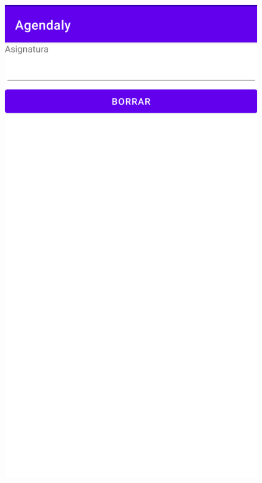 \documentclass[a4paper,openright,12pt]{article}
\begin{document}
\begin{figure}
            \includegraphics[scale=0.05]{borrar.png}

\end{figure}
\end{document}
